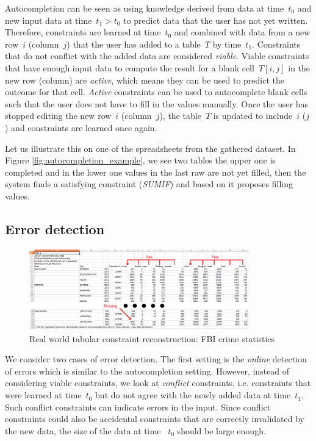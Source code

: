 \documentclass{IEEEtran}
\theoremstyle{definition}
\begin{document}
Autocompletion can be seen as using knowledge derived from data at time~$t_0$ and new input data at time~$t_1 > t_0$ to predict data that the user has not yet written.
Therefore, constraints are learned at time~$t_0$ and combined with data from a new row~$i$ (column~$j$) that the user has added to a table~$T$ by time~$t_1$.
Constraints that do not conflict with the added data are considered \textit{viable}.
Viable constraints that have enough input data to compute the result for a blank cell~$T[i,j]$ in the new row (column) are \textit{active}, which means they can be used to predict the outcome for that cell.
\textit{Active} constraints can be used to autocomplete blank cells such that the user does not have to fill in the values manually.
Once the user has stopped editing the new row~$i$ (column~$j$), the table~$T$ is updated to include~$i$ ($j$) and constraints are learned once again.

Let us illustrate this on one of the spreadsheets from the gathered dataset. In Figure \ref{fig:autocompletion_example}, we see two tables the upper one is completed and in the lower one values in the last raw are not yet filled, then the system finds a satisfying constraint (\textit{SUMIF}) and based on it proposes filling values.


\subsection{Error detection}
\begin{figure}[thb]
  \begin{center}
    \includegraphics[width=0.85\textwidth]{figures/fbi_figure_highlighted.png}
  \end{center}
  \caption{Real world tabular constraint reconstruction: FBI crime statistics}
  \label{fig:fbi}
\end{figure}


We consider two cases of error detection.
The first setting is the \textit{online} detection of errors which is similar to the autocompletion setting.
However, instead of considering viable constraints, we look at \textit{conflict} constraints, i.e. constraints that were learned at time~$t_0$ but do not agree with the newly added data at time~$t_1$.
Such conflict constraints can indicate errors in the input.
Since conflict constraints could also be accidental constraints that are correctly invalidated by the new data, the size of the data at time ~$t_0$ should be large enough.
\end{document}
